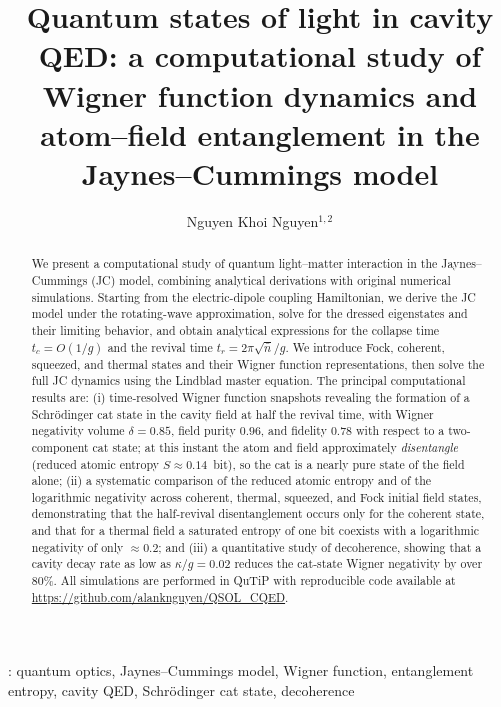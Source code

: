 \documentclass[12pt]{iopart}
\begin{document}
\title[Wigner dynamics and entanglement in the Jaynes--Cummings model]{Quantum states of light in cavity QED: a computational study of Wigner function dynamics and atom--field entanglement in the Jaynes--Cummings model}

\author{Nguyen Khoi Nguyen$^{1,2}$}
\address{$^{1}$ Department of Electrical and Computer Engineering, Boston University, Boston, MA 02215, USA}
\address{$^{2}$ Physics Department, Boston University, Boston, MA 02215, USA}

\begin{abstract}
We present a computational study of quantum light--matter interaction in the Jaynes--Cummings (JC) model, combining analytical derivations with original numerical simulations. Starting from the electric-dipole coupling Hamiltonian, we derive the JC model under the rotating-wave approximation, solve for the dressed eigenstates and their limiting behavior, and obtain analytical expressions for the collapse time $t_c = O(1/g)$ and the revival time $t_r = 2\pi\sqrt{\bar{n}}/g$. We introduce Fock, coherent, squeezed, and thermal states and their Wigner function representations, then solve the full JC dynamics using the Lindblad master equation. The principal computational results are: (i) time-resolved Wigner function snapshots revealing the formation of a Schr\"{o}dinger cat state in the cavity field at half the revival time, with Wigner negativity volume $\delta = 0.85$, field purity $0.96$, and fidelity $0.78$ with respect to a two-component cat state; at this instant the atom and field approximately \emph{disentangle} (reduced atomic entropy $S \approx 0.14$~bit), so the cat is a nearly pure state of the field alone; (ii) a systematic comparison of the reduced atomic entropy and of the logarithmic negativity across coherent, thermal, squeezed, and Fock initial field states, demonstrating that the half-revival disentanglement occurs only for the coherent state, and that for a thermal field a saturated entropy of one bit coexists with a logarithmic negativity of only $\approx 0.2$; and (iii) a quantitative study of decoherence, showing that a cavity decay rate as low as $\kappa/g = 0.02$ reduces the cat-state Wigner negativity by over 80\%. All simulations are performed in QuTiP with reproducible code available at \url{https://github.com/alanknguyen/QSOL_CQED}.
\end{abstract}

: quantum optics, Jaynes--Cummings model, Wigner function, entanglement entropy, cavity QED, Schr\"{o}dinger cat state, decoherence
\end{document}
